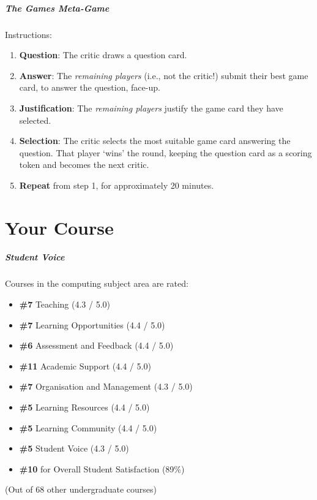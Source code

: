 \begin{frame}
	\frametitle{The Games Meta-Game}
	
	Instructions:
	
	\begin{enumerate}
		\item 	\textbf{Question}: The critic draws a question card. 
		\item 	\textbf{Answer}: The \textit{remaining players} (i.e., not the critic!) submit their best game card, to answer the question, face-up.
		\item 	\textbf{Justification}: The \textit{remaining players} justify the game card they have selected.
		\item 	\textbf{Selection}: The critic selects the most suitable game card answering the question. That player `wins' the round, keeping the question card as a scoring token
			and becomes the next critic.	
		\item 	\textbf{Repeat} from step 1, for approximately 20 minutes.	
	\end{enumerate}
\end{frame}
   
\part{Your Course}
\frame{\partpage}

\begin{frame}
	\frametitle{Student Voice}
	
	Courses in the computing subject area are rated:
	
	\begin{itemize}
		\item \textbf{\#7} Teaching (4.3 / 5.0)
		\item \textbf{\#7} Learning Opportunities (4.4 / 5.0)
		\item \textbf{\#6} Assessment and Feedback (4.4 / 5.0)
		\item \textbf{\#11} Academic Support (4.4 / 5.0)
		\item \textbf{\#7} Organisation and Management (4.3 / 5.0)
		\item \textbf{\#5} Learning Resources (4.4 / 5.0)
		\item \textbf{\#5} Learning Community (4.4 / 5.0)
		\item \textbf{\#5} Student Voice (4.3 / 5.0)
		\item \textbf{\#10} for Overall Student Satisfaction (89\%)
	\end{itemize}
	
	(Out of 68 other undergraduate courses)
	
\end{frame}

